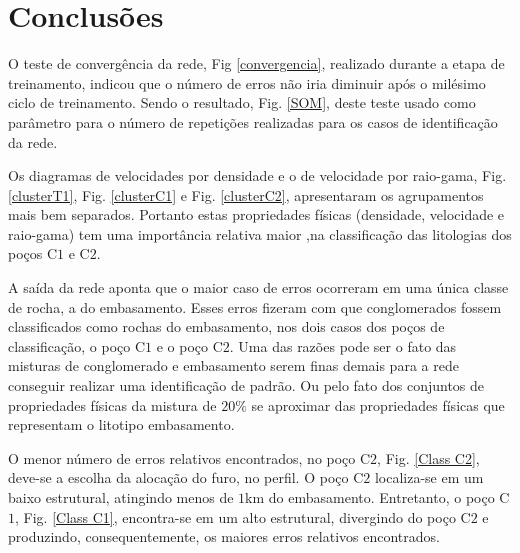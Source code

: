 \chapter{Conclusões}

O teste de convergência da rede, Fig \ref{convergencia}, realizado durante a etapa de treinamento, indicou que o número de erros não iria diminuir após o milésimo ciclo de treinamento. Sendo o resultado, Fig. \ref{SOM}, deste teste usado como parâmetro para o número de repetições realizadas para os casos de identificação da rede. 

Os diagramas de velocidades por densidade e o de velocidade por raio-gama, Fig. \ref{clusterT1}, Fig. \ref{clusterC1} e Fig. \ref{clusterC2}, apresentaram os agrupamentos mais bem separados. Portanto estas propriedades físicas (densidade, velocidade e raio-gama) tem uma importância relativa maior ,na classificação das litologias dos poços C$1$ e C$2$. 

A saída da rede aponta que o maior caso de erros ocorreram em uma única classe de rocha, a do embasamento. Esses erros fizeram com que conglomerados fossem classificados como rochas do embasamento, nos dois casos dos poços de classificação, o poço C$1$ e o poço C$2$.  Uma das razões pode ser o fato das misturas de conglomerado e embasamento serem finas demais para a rede conseguir realizar uma identificação de padrão. Ou pelo fato dos conjuntos de propriedades físicas da mistura de $20\%$ se aproximar das propriedades físicas que representam o litotipo embasamento. 

O menor número de erros relativos encontrados, no poço C$2$, Fig. \ref{Class C2}, deve-se a escolha da alocação do furo, no perfil. O poço C$2$ localiza-se em um baixo estrutural, atingindo menos de $1$km do embasamento. Entretanto, o poço C$1$, Fig. \ref{Class C1}, encontra-se em um alto estrutural, divergindo do poço C$2$ e produzindo, consequentemente, os maiores erros relativos encontrados.    


